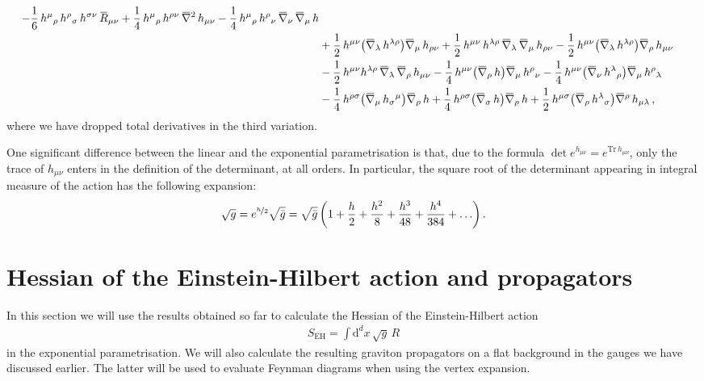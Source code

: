 \documentclass[11pt]{book}
\newcommand{\overbar}[1]{\mkern 1.5mu\overline{\mkern-1.5mu#1\mkern-1.5mu}\mkern 1.5mu}
\newcommand{\bnabla}{\overbar \nabla}
\newcommand{\bR}{\overbar R}
\newcommand{\Tr}{\mathrm{Tr}}
\numberwithin{equation}{chapter}
\begin{document}
\begin{appendices}
\begin{align}
  - \frac{1}{6} \, h^{\mu}{}_{\rho} \, h^{\rho}{}_{\sigma} \, h^{\sigma \nu} \, \bR_{\mu \nu}
  + \frac{1}{4} \, h^{\mu}{}_{\rho} \, h^{\rho\nu} \, \bnabla^2 \, h_{\mu \nu}
  - \frac{1}{4} \, h^{\mu}{}_{\rho} \, h^{\rho}{}_{\nu} \, \bnabla_{\nu} \, \bnabla_{\mu} \, h
  \nonumber \\ &
  + \frac{1}{2} \, h^{\mu \nu} \big( \bnabla_{\lambda} \, h^{\lambda \rho} \big) \bnabla_{\mu} \, h_{\rho \nu}
  + \frac{1}{2} \, h^{\mu \nu} \, h^{\lambda \rho} \, \bnabla_{\lambda} \, \bnabla_{\mu} \, h_{\rho \nu}
  - \frac{1}{2} \, h^{\mu \nu} \big( \bnabla_{\lambda} \, h^{\lambda \rho} \big) \bnabla_{\rho} \, h_{\mu \nu}
  \nonumber \\ &
  - \frac{1}{2} \, h^{\mu \nu} h^{\lambda \rho} \, \bnabla_{\lambda} \, \bnabla_{\rho} \, h_{\mu \nu}
  - \frac{1}{4} \, h^{\mu \nu} \big( \bnabla_{\rho} \, h \big) \bnabla_{\mu} \, h^{\rho}{}_{\nu}
  - \frac{1}{4} \, h^{\mu \nu} \big( \bnabla_{\nu} \, h^{\lambda}{}_{\rho} \big) \bnabla_{\mu} \, h^{\rho}{}_{\lambda}
  \nonumber \\ &
  - \frac{1}{4} \, h^{\rho \sigma} \big( \bnabla_{\mu} \, h_{\sigma}{}^{\mu} \big) \bnabla_{\rho} \, h
  + \frac{1}{4} \, h^{\rho \sigma} \big( \bnabla_{\sigma} \, h \big) \bnabla_{\rho} \, h
  + \frac{1}{2} \, h^{\mu \sigma} \big( \bnabla_{\rho} \, h^{\lambda}{}_{\sigma} \big) \bnabla^{\rho} \, h_{\mu\lambda} \,,
\end{align}
where we have dropped total derivatives in the third variation.

One significant difference between the linear and the exponential parametrisation is that,
due to the formula $\det e^{h_{\mu\nu}} = e^{\Tr \, h_{\mu\nu}}$, only the trace
of $h_{\mu\nu}$ enters in the definition of the determinant, at all orders.
In particular, the square root of the determinant appearing in integral
measure of the action has the following expansion:
\begin{align}
  \sqrt{g} = e^{\nicefrac{h}{2}} \sqrt{\bar g} =
  \sqrt{\bar g}
  \left(
    1
    + \frac{h}{2}
    + \frac{h^2}{8}
    + \frac{h^3}{48}
    + \frac{h^4}{384}
    + \ldots
  \right) .
\end{align}


\section{Hessian of the Einstein-Hilbert action and propagators}

In this section we will use the results obtained so far to
calculate the Hessian of the Einstein-Hilbert action
\begin{align}
  S_{\scriptscriptstyle \mathrm{EH}} = \int \mathrm d^dx \, \sqrt g \, R
\end{align}
in the exponential parametrisation.
We will also calculate
the resulting graviton propagators  on a flat background
in the gauges we have discussed earlier.
The latter will be used
to evaluate Feynman diagrams when using the vertex expansion.



\end{appendices}
\end{document}
